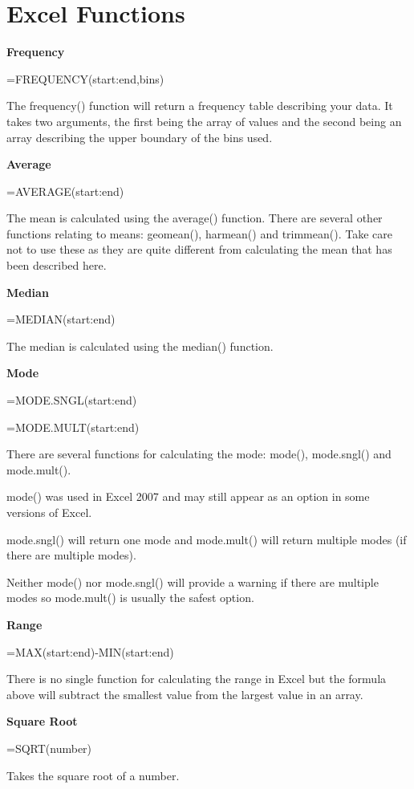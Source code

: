 \documentclass[
]{book}
\begin{document}
\hypertarget{excel-functions}{%
\section*{Excel Functions}\label{excel-functions}}

\textbf{Frequency}

=FREQUENCY(start:end,bins)

The frequency() function will return a frequency table describing your data. It takes two arguments, the first being the array of values and the second being an array describing the upper boundary of the bins used.

\textbf{Average}

=AVERAGE(start:end)

The mean is calculated using the average() function. There are several other functions relating to means: geomean(), harmean() and trimmean(). Take care not to use these as they are quite different from calculating the mean that has been described here.

\textbf{Median}

=MEDIAN(start:end)

The median is calculated using the median() function.

\textbf{Mode}

=MODE.SNGL(start:end)

=MODE.MULT(start:end)

There are several functions for calculating the mode: mode(), mode.sngl() and mode.mult().

mode() was used in Excel 2007 and may still appear as an option in some versions of Excel.

mode.sngl() will return one mode and mode.mult() will return multiple modes (if there are multiple modes).

Neither mode() nor mode.sngl() will provide a warning if there are multiple modes so mode.mult() is usually the safest option.

\textbf{Range}

=MAX(start:end)-MIN(start:end)

There is no single function for calculating the range in Excel but the formula above will subtract the smallest value from the largest value in an array.

\textbf{Square Root}

=SQRT(number)

Takes the square root of a number.
\end{document}
